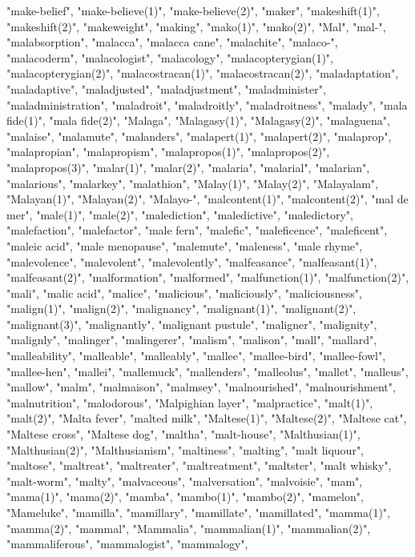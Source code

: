 "make-belief",
"make-believe(1)",
"make-believe(2)",
"maker",
"makeshift(1)",
"makeshift(2)",
"makeweight",
"making",
"mako(1)",
"mako(2)",
"Mal",
"mal-",
"malabsorption",
"malacca",
"malacca cane",
"malachite",
"malaco-",
"malacoderm",
"malacologist",
"malacology",
"malacopterygian(1)",
"malacopterygian(2)",
"malacostracan(1)",
"malacostracan(2)",
"maladaptation",
"maladaptive",
"maladjusted",
"maladjustment",
"maladminister",
"maladministration",
"maladroit",
"maladroitly",
"maladroitness",
"malady",
"mala fide(1)",
"mala fide(2)",
"Malaga",
"Malagasy(1)",
"Malagasy(2)",
"malaguena",
"malaise",
"malamute",
"malanders",
"malapert(1)",
"malapert(2)",
"malaprop",
"malapropian",
"malapropism",
"malapropos(1)",
"malapropos(2)",
"malapropos(3)",
"malar(1)",
"malar(2)",
"malaria",
"malarial",
"malarian",
"malarious",
"malarkey",
"malathion",
"Malay(1)",
"Malay(2)",
"Malayalam",
"Malayan(1)",
"Malayan(2)",
"Malayo-",
"malcontent(1)",
"malcontent(2)",
"mal de mer",
"male(1)",
"male(2)",
"malediction",
"maledictive",
"maledictory",
"malefaction",
"malefactor",
"male fern",
"malefic",
"maleficence",
"maleficent",
"maleic acid",
"male menopause",
"malemute",
"maleness",
"male rhyme",
"malevolence",
"malevolent",
"malevolently",
"malfeasance",
"malfeasant(1)",
"malfeasant(2)",
"malformation",
"malformed",
"malfunction(1)",
"malfunction(2)",
"mali",
"malic acid",
"malice",
"malicious",
"maliciously",
"maliciousness",
"malign(1)",
"malign(2)",
"malignancy",
"malignant(1)",
"malignant(2)",
"malignant(3)",
"malignantly",
"malignant pustule",
"maligner",
"malignity",
"malignly",
"malinger",
"malingerer",
"malism",
"malison",
"mall",
"mallard",
"malleability",
"malleable",
"malleably",
"mallee",
"mallee-bird",
"mallee-fowl",
"mallee-hen",
"mallei",
"mallemuck",
"mallenders",
"malleolus",
"mallet",
"malleus",
"mallow",
"malm",
"malmaison",
"malmsey",
"malnourished",
"malnourishment",
"malnutrition",
"malodorous",
"Malpighian layer",
"malpractice",
"malt(1)",
"malt(2)",
"Malta fever",
"malted milk",
"Maltese(1)",
"Maltese(2)",
"Maltese cat",
"Maltese cross",
"Maltese dog",
"maltha",
"malt-house",
"Malthusian(1)",
"Malthusian(2)",
"Malthusianism",
"maltiness",
"malting",
"malt liquour",
"maltose",
"maltreat",
"maltreater",
"maltreatment",
"maltster",
"malt whisky",
"malt-worm",
"malty",
"malvaceous",
"malversation",
"malvoisie",
"mam",
"mama(1)",
"mama(2)",
"mamba",
"mambo(1)",
"mambo(2)",
"mamelon",
"Mameluke",
"mamilla",
"mamillary",
"mamillate",
"mamillated",
"mamma(1)",
"mamma(2)",
"mammal",
"Mammalia",
"mammalian(1)",
"mammalian(2)",
"mammaliferous",
"mammalogist",
"mammalogy",
